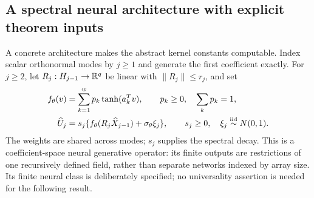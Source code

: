 \subsection{A spectral neural architecture with explicit theorem inputs}\label{sec:spectral-network}
A concrete architecture makes the abstract kernel constants computable. Index scalar orthonormal modes by $j\ge1$ and generate the first coefficient exactly. For $j\ge2$, let $R_j:H_{j-1}\to\mathbb R^q$ be linear with $\|R_j\|\le r_j$, and set
\begin{align}\label{eq:neural-detail}
 f_\theta(v)&=\sum_{k=1}^w p_k\tanh(a_k^Tv),
 \qquad p_k\ge0,\quad\sum_kp_k=1,\\
 \widehat U_j&=s_j\{f_\theta(R_j\widehat X_{j-1})+\sigma_\theta\xi_j\},
 \qquad s_j\ge0,\quad \xi_j\overset{\mathrm{iid}}\sim N(0,1).\notag
\end{align}
The weights are shared across modes; $s_j$ supplies the spectral decay. This is a coefficient-space neural generative operator: its finite outputs are restrictions of one recursively defined field, rather than separate networks indexed by array size. Its finite neural class is deliberately specified; no universality assertion is needed for the following result.

